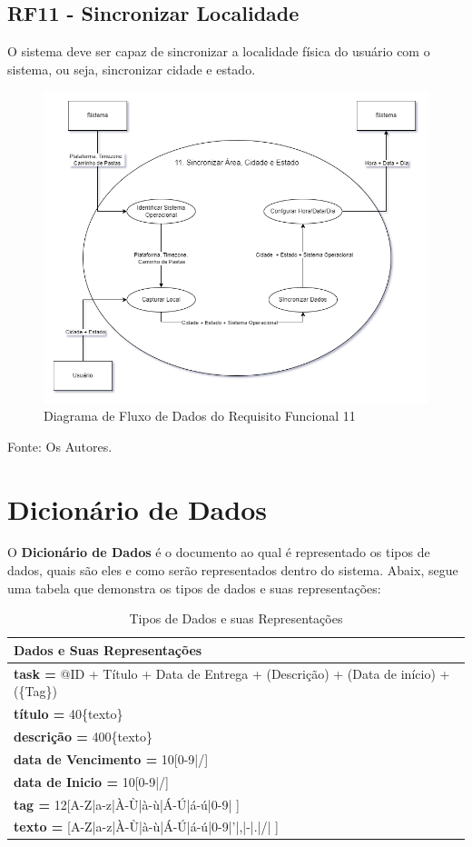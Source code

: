 \documentclass[a4paper,12pt]{article}
\begin{document}
\pagebreak
\subsection{RF11 - Sincronizar Localidade}
O sistema deve ser capaz de sincronizar a localidade física do usuário com o sistema, ou seja, sincronizar cidade e estado.
\begin{figure}[H]
	\centering
	\includegraphics[scale=0.45]{DFDs/RF11.drawio.png}
	\caption{Diagrama de Fluxo de Dados do Requisito Funcional 11}
\end{figure}
\noindent Fonte: Os Autores.

\pagebreak
\section{Dicionário de Dados}
O \textbf{Dicionário de Dados} é o documento ao qual é representado os tipos de dados, quais são eles e como serão 
representados dentro do sistema. Abaix, segue uma tabela que demonstra os tipos de dados e suas representações:

\begin{table}[H]
	\noindent
	\begin{tabular}{|l|}
		\hline
			\textbf{Dados e Suas Representações} \\ \hline
			\textbf{task =} @ID + Título + Data de Entrega + (Descrição) + (Data de início) + (\{Tag\})\\ \hline
			\textbf{título =} 40\{texto\} \\ \hline
			\textbf{descrição =} 400\{texto\} \\ \hline
			\textbf{data de Vencimento =} 10[0-9|/] \\ \hline
			\textbf{data de Inicio =} 10[0-9|/] \\ \hline
			\textbf{tag =} 12[A-Z|a-z|À-Ù|à-ù|Á-Ú|á-ú|0-9| ] \\ \hline
			\textbf{texto =} [A-Z|a-z|À-Ù|à-ù|Á-Ú|á-ú|0-9|'|,|-|.|/| ] \\ \hline
	\end{tabular}
	\caption{Tipos de Dados e suas Representações}
\end{table}
\end{document}
